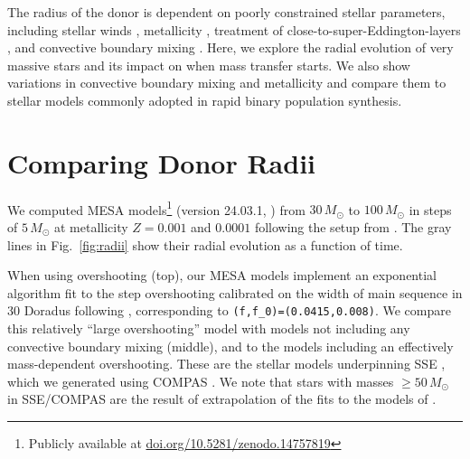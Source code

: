 \documentclass[twocolumn]{aastex63}
\DeclareRobustCommand{\Figref}[1]{Fig.~\ref{#1}}
\begin{document}
The radius of the donor is dependent on poorly constrained stellar
parameters, including stellar winds \citep{renzo:17, josiek:24},
metallicity \citep{xin:22}, treatment of
close-to-super-Eddington-layers \citep[e.g.,][]{joss:73, paxton:13,
  jiang:15, agrawal:22, jermyn:23}, and convective boundary mixing
\citep{anders:23, johnston:24}. Here, we explore the radial evolution
of very massive stars and its impact on when mass transfer starts. We
also show variations in convective boundary mixing and metallicity and
compare them to stellar models commonly adopted in rapid binary
population synthesis.

\section{Comparing Donor Radii}

We computed \textsc{MESA} models\footnote{Publicly available at
  \href{https://doi.org/10.5281/zenodo.14757819}{doi.org/10.5281/zenodo.14757819}}
(version 24.03.1, \citealt{paxton:11, paxton:13, paxton:15, paxton:18,
  paxton:19, jermyn:23}) from $30 \, M_{\odot}$ to $100 \, M_{\odot}$
in steps of $5\,M_\odot$ at metallicity $Z=0.001$ and $0.0001$
following the setup from \cite{renzo:23}. The gray lines in
\Figref{fig:radii} show their radial evolution as a function of time.

When using overshooting (top), our \textsc{MESA} models implement an
exponential algorithm \citep{herwig:00} fit to the step overshooting
calibrated on the width of main sequence in 30 Doradus
\citep[$\sim{}0.335$ pressure scale heights,][]{brott:11} following
\cite{claret:18}, corresponding to
\texttt{(f,f\_0)=(0.0415,0.008)}. We compare this relatively ``large
overshooting'' model with models not including any convective boundary
mixing (middle), and to the \cite{pols:98} models including an
effectively mass-dependent overshooting. These are the stellar models
underpinning \textsc{SSE} \citep{hurley:00}, which we generated using
\textsc{COMPAS} \citep{stevenson:17, vignagomez:18, riley:22}. We note
that stars with masses $\geq50\,M_\odot$ in
\textsc{SSE}/\textsc{COMPAS} are the result of extrapolation of the
fits to the models of \cite{pols:98}.
\end{document}
